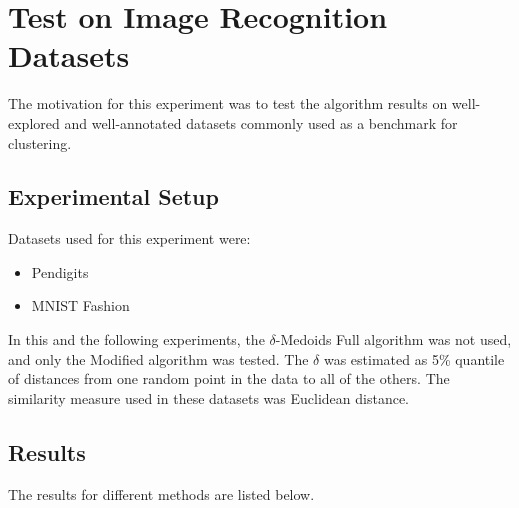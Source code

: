 \documentclass[thesis=B,english]{FITthesis}[2012/10/20]
\begin{document}
\newpage

\section{Test on Image Recognition Datasets}\label{sec:exp3}

The motivation for this experiment was to test the algorithm results on well-explored and well-annotated datasets commonly used as a benchmark for clustering.

\subsection{Experimental Setup}
Datasets used for this experiment were:
\begin{itemize}
    \item Pendigits
    \item MNIST Fashion
\end{itemize}

In this and the following experiments, the $\delta$-Medoids Full algorithm was not used, and only the Modified algorithm was tested.
The $\delta$ was estimated as 5\% quantile of distances from one random point in the data to all of the others.
The similarity measure used in these datasets was Euclidean distance.

\subsection{Results}

The results for different methods are listed below.
\end{document}
